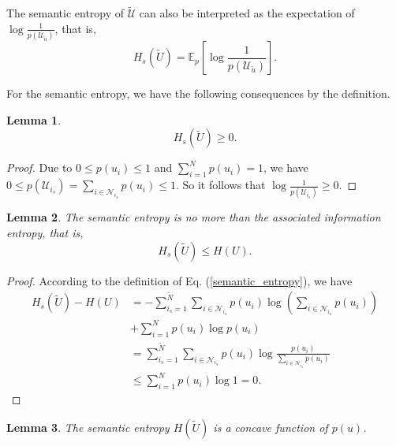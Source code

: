 \documentclass[12pt, draftclsnofoot,onecolumn]{IEEEtran}
\newtheorem{lemma}{\bf{Lemma}}
\begin{document}
The semantic entropy of $\tilde{\mathcal{U}}$ can also be interpreted as the expectation of $\log\frac{1}{p\left(\mathcal{U}_{\tilde{u}}\right)}$, that is,
\begin{equation}
H_s(\tilde{U})=\mathbb{E}_p \left[\log \frac{1}{p\left(\mathcal{U}_{\tilde{u}}\right)}\right].
\end{equation}

For the semantic entropy, we have the following consequences by the definition.
\begin{lemma}
\begin{equation}
H_s(\tilde{U})\geq 0.
\end{equation}
\end{lemma}
\begin{proof}
Due to $0\leq p(u_i) \leq1$ and $\sum_{i=1}^{N}p(u_i)=1$, we have $0\leq p(\mathcal{U}_{i_s})=\sum_{i\in\mathcal{N}_{i_s}}p\left(u_i\right) \leq1$. So it follows that $ \log \frac{1}{p(\mathcal{U}_{i_s})} \geq 0$. \qedhere
\end{proof}

\begin{lemma}\label{lemma2}
The semantic entropy is no more than the associated information entropy, that is,
\begin{equation}
H_s(\tilde{U})\leq H(U).
\end{equation}
\end{lemma}
\begin{proof}
According to the definition of Eq. (\ref{semantic_entropy}), we have
\begin{equation}
\begin{aligned}
H_s(\tilde{U})-H(U)&=-\sum_{i_s=1}^{\tilde{N}}\sum_{i\in\mathcal{N}_{i_s}}p\left(u_i\right) \log \left(\sum_{i\in\mathcal{N}_{i_s}}p\left(u_i\right)\right)\\
     &+\sum_{i=1}^{N} p\left(u_i\right) \log p\left(u_i\right)\\
     &=\sum_{i_s=1}^{\tilde{N}}\sum_{i\in\mathcal{N}_{i_s}}p\left(u_i\right) \log \frac{p\left(u_i\right)}{\sum_{i\in\mathcal{N}_{i_s}}p\left(u_i\right)}\\
     &\leq \sum_{i=1}^{N} p\left(u_i\right) \log 1 =0.
\end{aligned}
\end{equation}
\end{proof}

\begin{lemma}\label{concave_sementropy}
The semantic entropy $H(\tilde{U})$ is a concave function of $p(u)$.
\end{lemma}
\end{document}
